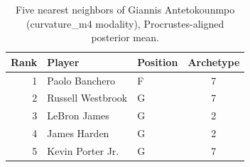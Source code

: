 \begin{table}[htbp]
  \centering\small
  \begin{tabular}{rllc}
    \toprule
    Rank & Player & Position & Archetype \\
    \midrule
    1 & Paolo Banchero & F & 7 \\
    2 & Russell Westbrook & G & 7 \\
    3 & LeBron James & G & 2 \\
    4 & James Harden & G & 2 \\
    5 & Kevin Porter Jr. & G & 7 \\
    \bottomrule
  \end{tabular}
  \caption{Five nearest neighbors of Giannis Antetokounmpo (curvature_m4 modality), Procrustes-aligned posterior mean.}
  \label{tab:Giannis_Antetokounmpo_neighbors_curvature_m4}
\end{table}

